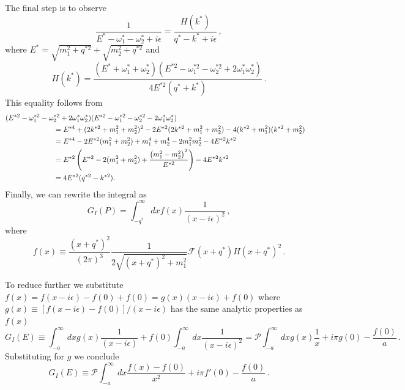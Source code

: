The final step is to observe
\begin{equation}
\frac{1}{E^*  -  \omega_{1}^* - \omega_{2}^* +    i\epsilon} = \frac{H(k^*)}{q^* - k^* + i \epsilon} \,,
\end{equation} 
where $E^{*}=\sqrt{m_1^2+q^{*2}}+\sqrt{m_2^2+q^{*2}}$ and 
\begin{equation}
H(k^*) = \frac{(E^*  +  \omega_{1}^* + \omega_{2}^*)(E^{*2} -  \omega_{1}^{*2} - \omega_{2}^{*2} + 2\omega_{1}^*  \omega_{2}^*)}{ 4 E^{*2}(q^*+k^*)} \,.
\end{equation}
This equality follows from
\begin{align}
(E^{*2} -  \omega_{1}^{*2} - \omega_{2}^{*2} + 2\omega_{1}^*  \omega_{2}^*) (E^{*2} -  \omega_{1}^{*2} - \omega_{2}^{*2} - 2\omega_{1}^*  \omega_{2}^*)
\nn\\
&\hspace{-6cm} =E^{*4}  + (2 k^{*2} + m_1^2 + m_2^2)^2  - 2 E^{*2} (2 k^{*2} + m_1^2 + m_2^2) - 4 ( k^{*2} + m_1^2 ) ( k^{*2} + m_2^2 )  \nn\\
&\hspace{-6cm} =E^{*4} - 2 E^{*2} (m_1^2 + m_2^2) + m^4_1 +m^4_2 -2m^2_1m^2_2-4E^{*2}k^{*2}\nn\\
&\hspace{-6cm} =E^{*2}\left(E^{*2} - 2  (m_1^2 + m_2^2) + \frac{\left(m^2_1 -m^2_2\right)^{2}}{E^{*2}}\right)-4E^{*2}k^{*2}
\nn\\
&\hspace{-6cm} = 4 E^{*2}(q^{*2}-k^{*2}).
\end{align}
Finally, we can rewrite the integral as
\begin{equation}
G_{I}(P)  = 
\int_{-q^*}^\infty d x f(x)
 \frac{1}{(x -    i\epsilon)^2}
  \,,
\end{equation}
where
\begin{equation}
f(x) \equiv   \frac{ (x+q^*)^{2}}{(2 \pi)^3} \frac{1}{2 \sqrt{(x+q^*)^2 + m_1^2}} \mathcal F( x+q^*) H(x+q^*)^2  \,.
\end{equation}


To reduce further we substitute $f(x) = f(x- i \epsilon) - f(0) + f(0) = g(x) (x - i \epsilon) + f(0) $ where $g(x) \equiv [f(x- i \epsilon) - f(0)]/(x - i \epsilon)$ has the same analytic properties as $f(x)$
\begin{equation}
G_I(E) \equiv \int_{-a}^\infty dx  g(x) \frac{1}{(x - i \epsilon)} + f(0) \int_{-a}^\infty dx   \frac{1}{(x - i \epsilon)^2} = \mathcal P \int_{-a}^\infty dx  g(x) \frac{1}{x} + i \pi g(0) - \frac{f(0)}{a} \,.
\end{equation}
Substituting for $g$ we conclude
\begin{equation}
\label{eq:simpresult}
G_I(E) \equiv  \mathcal P \int_{-a}^\infty dx  \frac{f(x) - f(0)}{x^2} + i \pi f'(0) - \frac{f(0)}{a} \,.
\end{equation}


